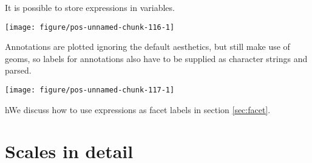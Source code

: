 \documentclass[paper=a4,headsepline,BCOR=12mm,twoside,open=right,%
titlepage,headings=small,fontsize=10pt,index=totoc,bibliography=totoc,%
captions=tableheading,captions=nooneline]{scrbook}\usepackage{knitr}
\begin{document}
It is possible to store expressions in variables.

\begin{knitrout}\footnotesize
{}\color{fgcolor}\begin{kframe}
\begin{alltt}
 \hlkwb{<-} \hlstd{(}\hlstd{(alpha[}\hlstd{]} \hlopt{+} 
 \hlopt{+} \hlstd{(}
\end{alltt}
\end{kframe}

{\centering \texttt{[image: figure/pos-unnamed-chunk-116-1]} 

}



\end{knitrout}

Annotations are plotted ignoring the default aesthetics, but still make use of geoms, so labels for annotations also have to be supplied as character strings and parsed.

\begin{knitrout}\footnotesize
{}\color{fgcolor}\begin{kframe}
\begin{alltt}
 \hlopt{+} \hlstd{(}\hlstd{,}\hlstd{)} \hlopt{+}
  \hlstd{(}\hlstd{,} \hlstd{=}\hlstd{,}
           \hlstd{=}\hlstd{,} \hlstd{=}\hlstd{,} \hlstd{=}\hlstd{,} \hlstd{=}\hlstd{,} \hlstd{=}\hlstd{)}
\end{alltt}
\end{kframe}

{\centering \texttt{[image: figure/pos-unnamed-chunk-117-1]} 

}



\end{knitrout}

hWe discuss how to use expressions as facet labels in section \ref{sec:facet}.

\section{Scales in detail}
\end{document}
